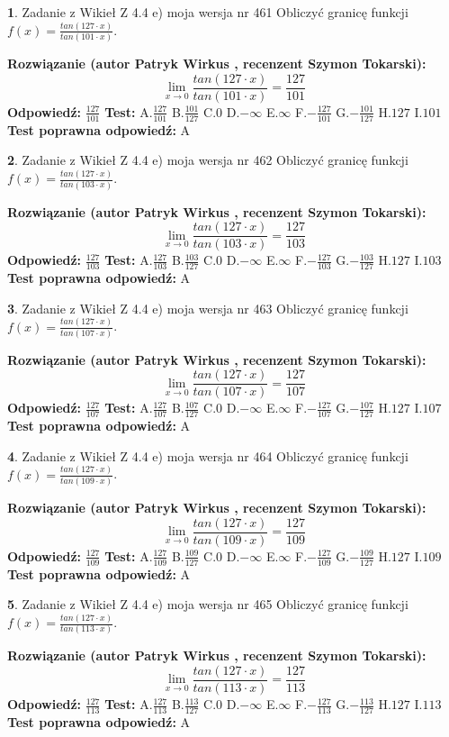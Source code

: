\documentclass[12pt, a4paper]{article}
\theoremstyle{definition} %
\newtheorem{zad}{}
\newcommand{\zadStart}[1]{\begin{zad}#1\newline}
\newcommand{\zadStop}{\end{zad}}
\newcommand{\rozwStart}[2]{\noindent \textbf{Rozwiązanie (autor #1 , recenzent #2): }\newline}
\newcommand{\rozwStop}{\newline}
\newcommand{\odpStart}{\noindent \textbf{Odpowiedź:}\newline}
\newcommand{\odpStop}{\newline}
\newcommand{\testStart}{\noindent \textbf{Test:}\newline}
\newcommand{\testStop}{\newline}
\newcommand{\kluczStart}{\noindent \textbf{Test poprawna odpowiedź:}\newline}
\newcommand{\kluczStop}{\newline}
\begin{document}
\zadStart{Zadanie z Wikieł Z 4.4 e) moja wersja nr 461}
Obliczyć granicę funkcji $f(x)=\frac{tan(127\cdot x)}{tan(101\cdot x)}$.
\zadStop
\rozwStart{Patryk Wirkus}{Szymon Tokarski}
$$\lim\limits_{x\to 0}\frac{tan(127\cdot x)}{tan(101\cdot x)}=
\frac{127}{101}$$
\rozwStop
\odpStart
$\frac{127}{101}$
\odpStop
\testStart
A.$\frac{127}{101}$
B.$\frac{101}{127}$
C.$0$
D.$-\infty$
E.$\infty$
F.$-\frac{127}{101}$
G.$-\frac{101}{127}$
H.$127$
I.$101$
\testStop
\kluczStart
A
\kluczStop



\zadStart{Zadanie z Wikieł Z 4.4 e) moja wersja nr 462}
Obliczyć granicę funkcji $f(x)=\frac{tan(127\cdot x)}{tan(103\cdot x)}$.
\zadStop
\rozwStart{Patryk Wirkus}{Szymon Tokarski}
$$\lim\limits_{x\to 0}\frac{tan(127\cdot x)}{tan(103\cdot x)}=
\frac{127}{103}$$
\rozwStop
\odpStart
$\frac{127}{103}$
\odpStop
\testStart
A.$\frac{127}{103}$
B.$\frac{103}{127}$
C.$0$
D.$-\infty$
E.$\infty$
F.$-\frac{127}{103}$
G.$-\frac{103}{127}$
H.$127$
I.$103$
\testStop
\kluczStart
A
\kluczStop



\zadStart{Zadanie z Wikieł Z 4.4 e) moja wersja nr 463}
Obliczyć granicę funkcji $f(x)=\frac{tan(127\cdot x)}{tan(107\cdot x)}$.
\zadStop
\rozwStart{Patryk Wirkus}{Szymon Tokarski}
$$\lim\limits_{x\to 0}\frac{tan(127\cdot x)}{tan(107\cdot x)}=
\frac{127}{107}$$
\rozwStop
\odpStart
$\frac{127}{107}$
\odpStop
\testStart
A.$\frac{127}{107}$
B.$\frac{107}{127}$
C.$0$
D.$-\infty$
E.$\infty$
F.$-\frac{127}{107}$
G.$-\frac{107}{127}$
H.$127$
I.$107$
\testStop
\kluczStart
A
\kluczStop



\zadStart{Zadanie z Wikieł Z 4.4 e) moja wersja nr 464}
Obliczyć granicę funkcji $f(x)=\frac{tan(127\cdot x)}{tan(109\cdot x)}$.
\zadStop
\rozwStart{Patryk Wirkus}{Szymon Tokarski}
$$\lim\limits_{x\to 0}\frac{tan(127\cdot x)}{tan(109\cdot x)}=
\frac{127}{109}$$
\rozwStop
\odpStart
$\frac{127}{109}$
\odpStop
\testStart
A.$\frac{127}{109}$
B.$\frac{109}{127}$
C.$0$
D.$-\infty$
E.$\infty$
F.$-\frac{127}{109}$
G.$-\frac{109}{127}$
H.$127$
I.$109$
\testStop
\kluczStart
A
\kluczStop



\zadStart{Zadanie z Wikieł Z 4.4 e) moja wersja nr 465}
Obliczyć granicę funkcji $f(x)=\frac{tan(127\cdot x)}{tan(113\cdot x)}$.
\zadStop
\rozwStart{Patryk Wirkus}{Szymon Tokarski}
$$\lim\limits_{x\to 0}\frac{tan(127\cdot x)}{tan(113\cdot x)}=
\frac{127}{113}$$
\rozwStop
\odpStart
$\frac{127}{113}$
\odpStop
\testStart
A.$\frac{127}{113}$
B.$\frac{113}{127}$
C.$0$
D.$-\infty$
E.$\infty$
F.$-\frac{127}{113}$
G.$-\frac{113}{127}$
H.$127$
I.$113$
\testStop
\kluczStart
A
\kluczStop
\end{document}
